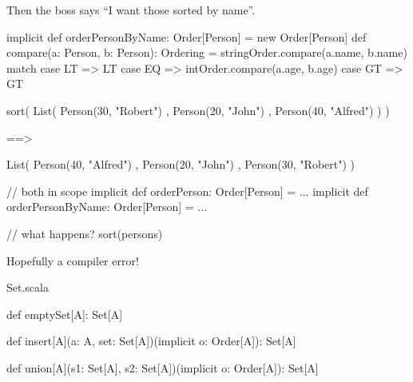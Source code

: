 \documentclass[usenames,dvipsnames,svgnames,table,aspectratio=169,mathserif]{beamer}
\newcommand{\nl}{\vspace{\baselineskip}}
\newcommand{\pnl}{\pause \nl}
\begin{document}
\begin{frame}[fragile]
Then the boss says ``I want those sorted by name''.

\pnl

\begin{scalacode}
implicit def orderPersonByName: Order[Person] = new Order[Person] {
  def compare(a: Person, b: Person): Ordering =
    stringOrder.compare(a.name, b.name) match {
      case LT => LT
      case EQ => intOrder.compare(a.age, b.age)
      case GT => GT
    }
}
\end{scalacode}


\end{frame}


\begin{frame}[fragile]
\begin{scalacode}
sort(
  List(
    Person(30, "Robert")
  , Person(20, "John")
  , Person(40, "Alfred")
  )
)
\end{scalacode}

\pnl

\begin{scalacode}
==>

List(
  Person(40, "Alfred")
, Person(20, "John")
, Person(30, "Robert")
)

\end{scalacode}
\end{frame}


\begin{frame}[fragile]
\begin{scalacode}
// both in scope
implicit def orderPerson: Order[Person] = ...
implicit def orderPersonByName: Order[Person] = ...

// what happens?
sort(persons)
\end{scalacode}

\pnl

Hopefully a compiler error!
\end{frame}





\begin{frame}[fragile]
\begin{block}{Set.scala}
\begin{scalacode}
def emptySet[A]: Set[A]

def insert[A](a: A, set: Set[A])(implicit o: Order[A]): Set[A]

def union[A](s1: Set[A], s2: Set[A])(implicit o: Order[A]): Set[A]
\end{scalacode}
\end{block}
\end{frame}
\end{document}

